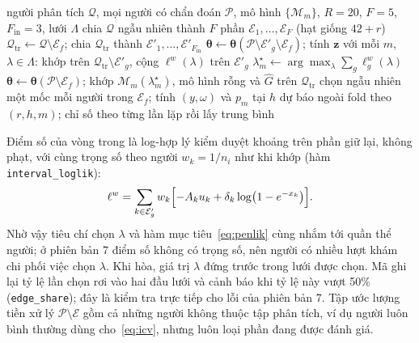 \documentclass[journal]{IEEEtran}
\newcommand{\code}[1]{\texttt{#1}}
\begin{document}
\begin{algorithm}[t]
\caption{CV lặp theo người, lồng chọn $\lambda$, tiền xử lý trong fold}\label{alg:cv}
\begin{algorithmic}[1]
\Require người phân tích $\mathcal Q$, mọi người có chẩn đoán $\mathcal P$, mô hình $\{\mathcal M_m\}$, $R=20$, $F=5$, $F_{\text{in}}=3$, lưới $\Lambda$
\State chia $\mathcal Q$ ngẫu nhiên thành $F$ phần $\mathcal E_1,\dots,\mathcal E_F$ (hạt giống $42+r$)
\State $\mathcal Q_{\text{tr}}\gets\mathcal Q\setminus\mathcal E_f$; chia $\mathcal Q_{\text{tr}}$ thành $\mathcal E'_1,\dots,\mathcal E'_{F_{\text{in}}}$
 
\State $\bm\theta\gets\bm\theta(\mathcal P\setminus\mathcal E'_g\setminus\mathcal E_f)$; tính $\bm z$
\State với mỗi $m$, $\lambda\in\Lambda$: khớp trên $\mathcal Q_{\text{tr}}\setminus\mathcal E'_g$, cộng $\ell^{w}(\lambda)$ trên $\mathcal E'_g$
\EndFor
\State $\lambda^\star_m\gets\arg\max_\lambda\sum_g\ell^{w}_g(\lambda)$
\State $\bm\theta\gets\bm\theta(\mathcal P\setminus\mathcal E_f)$; khớp $\mathcal M_m(\lambda^\star_m)$, mô hình rỗng và $\hat G$ trên $\mathcal Q_{\text{tr}}$
\State chọn ngẫu nhiên một mốc mỗi người trong $\mathcal E_f$; tính $(y,\omega)$ và $p_m$ tại $h$
\EndFor
\EndFor
\Ensure dự báo ngoài fold theo $(r,h,m)$; chỉ số theo từng lần lặp rồi lấy trung bình
\end{algorithmic}
\end{algorithm}

Điểm số của vòng trong là log-hợp lý kiểm duyệt khoảng trên phần giữ lại, không phạt, với cùng trọng số theo người $w_k=1/n_i$ như khi khớp (hàm \code{interval\_loglik}):
\begin{equation}\label{eq:innerscore}
\ell^{w}=\sum_{k\in\mathcal E'_g}w_k\Bigl[-A_ku_k+\delta_k\log\bigl(1-e^{-x_k}\bigr)\Bigr].
\end{equation}
Nhờ vậy tiêu chí chọn $\lambda$ và hàm mục tiêu~\eqref{eq:penlik} cùng nhắm tới quần thể người; ở phiên bản 7 điểm số không có trọng số, nên người có nhiều lượt khám chi phối việc chọn $\lambda$. Khi hòa, giá trị $\lambda$ đứng trước trong lưới được chọn. Mã ghi lại tỷ lệ lần chọn rơi vào hai đầu lưới và cảnh báo khi tỷ lệ này vượt 50\% (\code{edge\_share}); đây là kiểm tra trực tiếp cho lỗi của phiên bản 7. Tập ước lượng tiền xử lý $\mathcal P\setminus\mathcal E$ gồm cả những người không thuộc tập phân tích, ví dụ người luôn bình thường dùng cho~\eqref{eq:icv}, nhưng luôn loại phần đang được đánh giá.
\end{document}
